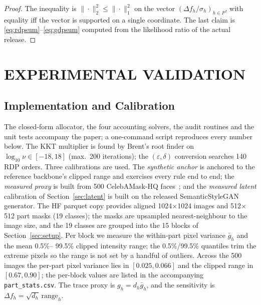 \documentclass{ieeetj}
\theoremstyle{plain}
\theoremstyle{definition}
\begin{document}
\begin{proof}
The inequality is $\|\cdot\|_2^2\le\|\cdot\|_1^2$ on the vector
$(\Delta f_h/\sigma_h)_{h\in P}$, with equality iff the vector is supported on
a single coordinate. The last claim is \eqref{eq:rdpsum}--\eqref{eq:gdpsum}
computed from the likelihood ratio of the actual release.
\end{proof}



\section{EXPERIMENTAL VALIDATION}
\label{sec:experiments}

\subsection{Implementation and Calibration}

The closed-form allocator, the four accounting solvers, the audit routines and
the unit tests accompany the paper; a one-command script reproduces every
number below. The KKT multiplier is found by Brent's root finder on $\log_{10}\nu\in[-18,18]$
(max.\ 200 iterations); the $(\varepsilon,\delta)$ conversion searches 140 RDP orders.
Three calibrations are used. The \emph{synthetic anchor} is anchored to the
reference backbone's clipped range and exercises every rule end to end; the
\emph{measured proxy} is built from 500 CelebAMask-HQ faces~\cite{celebamaskhq};
and the \emph{measured latent} calibration of Section~\ref{sec:latent} is built
on the released SemanticStyleGAN generator. The HF parquet
copy provides aligned 1024$\times$1024 images and 512$\times$512 part masks
(19 classes); the masks are upsampled nearest-neighbour to the image size, and
the 19 classes are grouped into the 15 blocks of Section~\ref{sec:setup}. Per
block we measure the within-part pixel variance $\bar g_h$ and the mean 0.5\%--
99.5\% clipped intensity range; the 0.5\%/99.5\% quantiles trim the extreme
pixels so the range is not set by a handful of outliers. Across the 500 images
the per-part pixel variance lies in $[0.025,0.066]$ and the clipped range in
$[0.67,0.90]$; the per-block values are listed in the accompanying
\texttt{part\_stats.csv}. The trace proxy is $g_h=d_h\bar g_h$, and the
sensitivity is $\Delta f_h=\sqrt{d_h}\,\mathrm{range}_h$.
\end{document}
